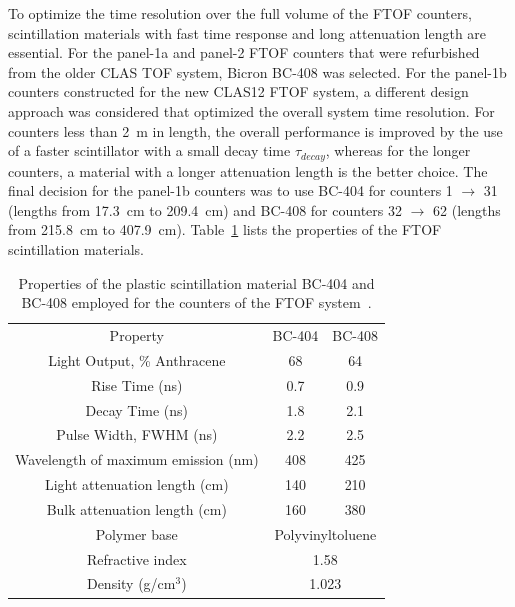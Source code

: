 \documentclass[3p,times,twocolumn]{elsarticle}
\begin{document}
To optimize the time resolution over the full volume of the FTOF counters, scintillation materials with
fast time response and long attenuation length are essential. For the panel-1a and panel-2 FTOF counters
that were refurbished from the older CLAS TOF system, Bicron BC-408 was selected. For the panel-1b
counters constructed for the new CLAS12 FTOF system, a different design approach was considered
that optimized the overall system time resolution. For counters less than 2~m in length, the overall
performance is improved by the use of a faster scintillator with a small decay time $\tau_{decay}$, whereas
for the longer counters, a material with a longer attenuation length is the better choice. The final decision
for the panel-1b counters was to use BC-404 for counters 1 $\to$ 31 (lengths from 17.3~cm to 209.4~cm)
and BC-408 for counters 32 $\to$ 62 (lengths from 215.8~cm to 407.9~cm). Table~\ref{scint-specs}
lists the properties of the FTOF scintillation materials.

\begin{table}[t]
\begin{center}
\begin{tabular}{c|c|c} \hline
Property                                    & BC-404     & BC-408  \\    
Light Output, \% Anthracene  & 68             &  64    \\ 
Rise Time (ns)                           & 0.7             & 0.9    \\ 
Decay Time (ns)                         & 1.8             & 2.1     \\ 
Pulse Width, FWHM (ns)         & 2.2              & 2.5    \\ 
Wavelength of maximum emission (nm) & 408    & 425 \\ 
Light attenuation length (cm)   & 140             & 210   \\ 
Bulk attenuation length (cm)     & 160             & 380  \\ 
Polymer base                             & \multicolumn{2}{c}{Polyvinyltoluene} \\ 
Refractive index                       & \multicolumn{2}{c}{1.58}                    \\  
Density (g/cm$^3$)                  & \multicolumn{2}{c}{1.023}                    \\ \hline 
\end{tabular}
\end{center}
\caption{Properties of the plastic scintillation material BC-404 and BC-408 employed for the counters
of the FTOF system~\cite{scint-mat-ref}.}
\label{scint-specs}
\end{table}
\end{document}
